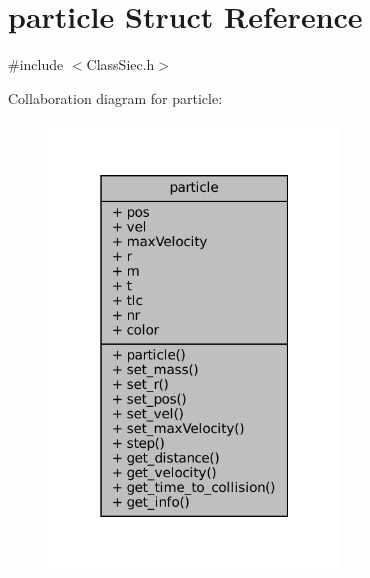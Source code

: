 \hypertarget{structparticle}{}\section{particle Struct Reference}
\label{structparticle}


{\ttfamily \#include $<$Class\+Siec.\+h$>$}



Collaboration diagram for particle\+:\nopagebreak
\begin{figure}[H]
\begin{center}
\leavevmode
\includegraphics[width=220pt]{structparticle__coll__graph}
\end{center}
\end{figure}
